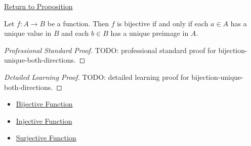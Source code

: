 \newpage
{}
\label{prf:bijection-unique-both-directions}

\begin{remark*}[Return]
\hyperref[prop:bijection-unique-both-directions]{Return to Proposition}
\end{remark*}

\begin{proposition*}
Let $f:A\to B$ be a function. Then $f$ is bijective if and only if each
$a\in A$ has a unique value in $B$ and each $b\in B$ has a unique preimage in
$A$.
\end{proposition*}

\begin{proof}[Professional Standard Proof]
\LRAProofBodyStart
TODO: professional standard proof for bijection-unique-both-directions.
\end{proof}

\begin{proof}[Detailed Learning Proof]
\LRAProofBodyStart
TODO: detailed learning proof for bijection-unique-both-directions.
\end{proof}

\begin{remark*}

\end{remark*}

\begin{dependencies}
\begin{itemize}
  \item \hyperref[def:bijective]{Bijective Function}
  \item \hyperref[def:injective]{Injective Function}
  \item \hyperref[def:surjective]{Surjective Function}
\end{itemize}
\end{dependencies}

\clearpage
